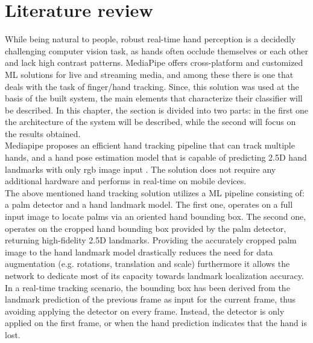 \setcounter{chapter}{0}
\chapter{Literature review}
\label{chap:stateoftheart}


While being natural to people, robust real-time hand perception is a decidedly challenging computer vision task, as hands often occlude themselves or each other and lack high contrast patterns. MediaPipe \cite[]{lugaresi2019mediapipe} offers cross-platform and customized ML solutions for live and streaming media, and among these there is one that deals with the task of finger/hand tracking. Since, this solution was used at the basis of the built system, the main elements that characterize their classifier will be described. In this chapter, the section is divided into two parts: in the first one the architecture of the system will be described, while the second will focus on the results obtained. \\

\noindent Mediapipe proposes an efficient hand tracking pipeline that can track multiple hands, and a hand pose estimation model that is capable of predicting 2.5D hand landmarks with only \gls{rgb} image input \cite[]{zhang2020mediapipe}. The solution does not require any additional hardware and performs in real-time on mobile devices. \\

\noindent The above mentioned hand tracking solution utilizes a ML pipeline consisting of: a palm detector and a hand landmark model. The first one, operates on a full input image to locate palms via an oriented hand bounding box. The second one, operates on the cropped hand bounding box provided by the palm detector, returning high-fidelity 2.5D landmarks. Providing the accurately cropped palm image to the hand landmark model drastically reduces the need for data augmentation (e.g. rotations, translation and scale) furthermore it allows the network to dedicate most of its capacity towards landmark localization accuracy. In a real-time tracking scenario, the bounding box has been derived from the landmark prediction of the previous frame as input for the current frame, thus avoiding applying the detector on every frame. Instead, the detector is only applied on the first frame, or when the hand prediction indicates that the hand is lost. \\

